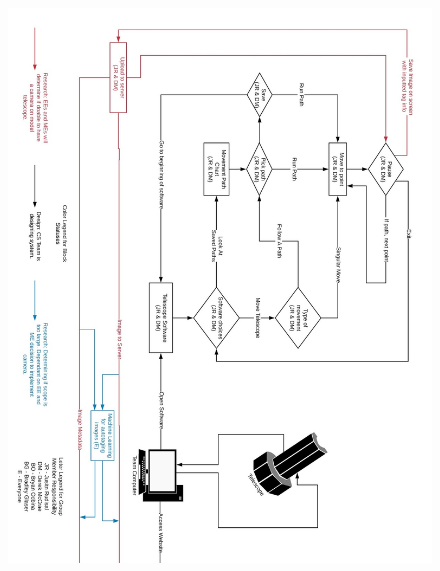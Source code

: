 \documentclass[12pt]{report}
\begin{document}
\begin{figure}[h]
	\centering
	\includegraphics[width=1.00\linewidth, height=17.0cm]{blockpt2}
\end{figure}

\newpage
\end{document}
